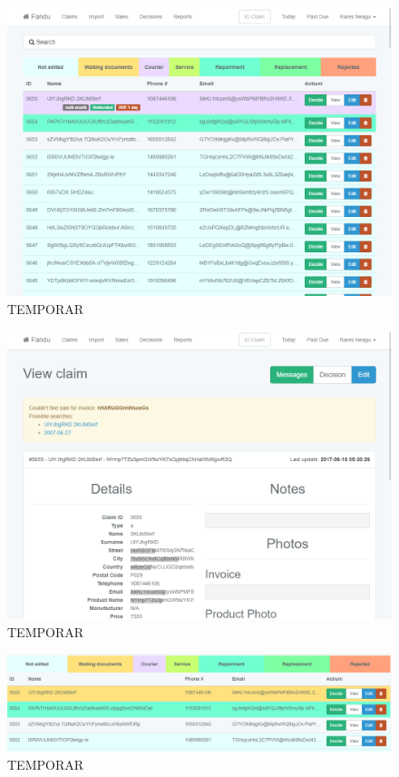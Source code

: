 	\begin{figure}
		\includegraphics[width=\linewidth]{../imagini/claims_tags.png}
		\caption{TEMPORAR}
		\label{fig:TEMP}
	\end{figure}
	\begin{figure}
		\includegraphics[width=\linewidth]{../imagini/claims_view.png}
		\caption{TEMPORAR}
		\label{fig:TEMP}
	\end{figure}
	\begin{figure}
		\includegraphics[width=\linewidth]{../imagini/color_coding.png}
		\caption{TEMPORAR}
		\label{fig:TEMP}
	\end{figure}

